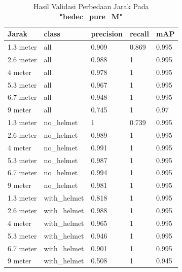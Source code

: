 \begin{enumerate}
  \begin{table}[ht]
    \centering
    \caption{Hasil Validasi Perbedaan Jarak Pada \textbf{"hedec\_pure\_M"}}
    \label{tb:hasiljarak_hedec_pure_M}
    \begin{tabular}{|l|l|l|l|l|} 
      \hline
      Jarak     & class        & precision & recall & mAP    \\ 
      \hline
      1.3 meter & all          & 0.909     & 0.869  & 0.995  \\
      2.6 meter & all          & 0.988     & 1      & 0.995  \\
      4 meter   & all          & 0.978     & 1      & 0.995  \\
      5.3 meter & all          & 0.967     & 1      & 0.995  \\
      6.7 meter & all          & 0.948     & 1      & 0.995  \\
      9 meter   & all          & 0.745     & 1      & 0.97   \\
      1.3 meter & no\_helmet   & 1         & 0.739  & 0.995  \\
      2.6 meter & no\_helmet   & 0.989     & 1      & 0.995  \\
      4 meter   & no\_helmet   & 0.991     & 1      & 0.995  \\
      5.3 meter & no\_helmet   & 0.987     & 1      & 0.995  \\
      6.7 meter & no\_helmet   & 0.994     & 1      & 0.995  \\
      9 meter   & no\_helmet   & 0.981     & 1      & 0.995  \\
      1.3 meter & with\_helmet & 0.818     & 1      & 0.995  \\
      2.6 meter & with\_helmet & 0.988     & 1      & 0.995  \\
      4 meter   & with\_helmet & 0.965     & 1      & 0.995  \\
      5.3 meter & with\_helmet & 0.946     & 1      & 0.995  \\
      6.7 meter & with\_helmet & 0.901     & 1      & 0.995  \\
      9 meter   & with\_helmet & 0.508     & 1      & 0.945  \\
      \hline
    \end{tabular}
  \end{table}


\end{enumerate}
